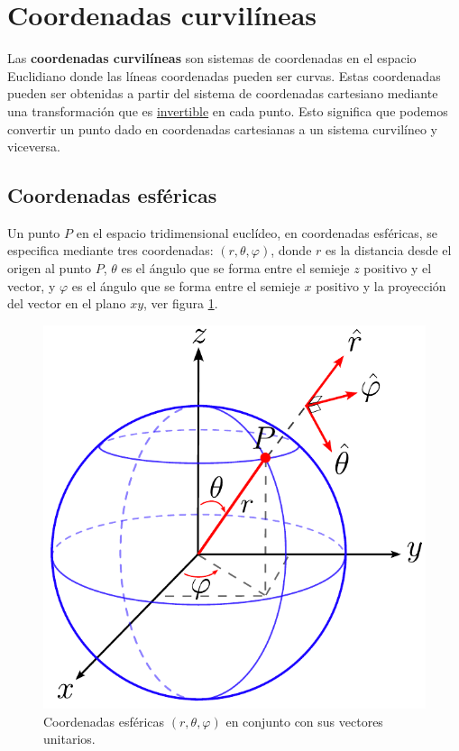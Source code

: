 \section{Coordenadas curvilíneas}

Las \textbf{coordenadas curvilíneas} son sistemas de coordenadas en el espacio Euclidiano donde las líneas coordenadas pueden ser curvas. Estas coordenadas pueden ser obtenidas a partir del sistema de coordenadas cartesiano mediante una transformación que es \underline{invertible} en cada punto. Esto significa que podemos convertir un punto dado en coordenadas cartesianas a un sistema curvilíneo y viceversa.

\subsection{Coordenadas esféricas}

Un punto $P$ en el espacio tridimensional euclídeo, en coordenadas esféricas, se especifica mediante tres coordenadas: $(r, \theta, \varphi)$, donde $r$ es la distancia desde el origen al punto $P$, $\theta$ es el ángulo que se forma entre el semieje $z$ positivo y el vector, y $\varphi$ es el ángulo que se forma entre el semieje $x$ positivo y la proyección del vector en el plano $xy$, ver figura \ref{fig:Coordenadas-Esfericas}.

\begin{figure}[H]
    \centering
    \includegraphics[scale = 0.65]{Figuras/Coordenadas-Esfericas.pdf}
    \caption{Coordenadas esféricas $(r,\theta,\varphi)$ en conjunto con sus vectores unitarios.}
    \label{fig:Coordenadas-Esfericas}
\end{figure}

